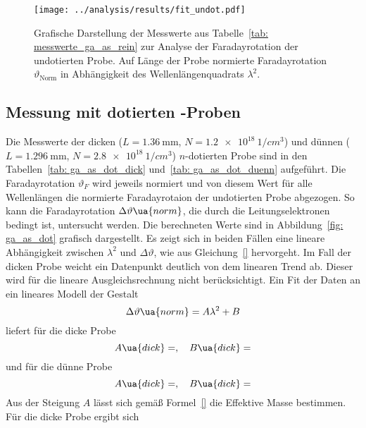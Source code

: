 \begin{figure}
\centering
\texttt{[image: ../analysis/results/fit\_undot.pdf]}
\caption{Grafische Darstellung der Messwerte aus Tabelle~\ref{tab: messwerte_ga_as_rein} zur Analyse der 
Faradayrotation der undotierten Probe. Auf Länge der Probe normierte 
Faradayrotation $\vartheta_{\text{Norm}}$ in Abhängigkeit des Wellenlängenquadrats $\lambda^2$. }
\label{fig: ga_as_rein}
\end{figure}


\subsection{Messung mit dotierten -Proben}

Die Messwerte der dicken ($L = \SI{1.36}{\milli\meter}$, $N = \SI{1.2e18}{1/cm^3}$) und dünnen 
($L = \SI{1.296}{\milli\meter}$, $N = \SI{2.8e18}{1/cm^3}$) $n$-dotierten Probe sind in den 
Tabellen~\ref{tab: ga_as_dot_dick} und~\ref{tab: ga_as_dot_duenn} aufgeführt. Die Faradayrotation $\vartheta_F$ wird jeweils normiert und von diesem 
Wert für alle Wellenlängen die normierte Faradayrotaion der undotierten Probe abgezogen. So kann 
die Faradayrotation $\Delta \vartheta\ua{norm}$, die durch die Leitungselektronen bedingt ist, untersucht werden. Die berechneten Werte 
sind in Abbildung~\ref{fig: ga_as_dot} grafisch dargestellt. Es zeigt sich in beiden Fällen eine lineare Abhängigkeit zwischen $\lambda^2$
und $\Delta \vartheta$, wie aus Gleichung~\eqref{} hervorgeht. Im Fall der dicken Probe weicht ein Datenpunkt deutlich 
von dem linearen Trend ab. Dieser wird für die lineare Ausgleichsrechnung nicht berücksichtigt. Ein Fit der Daten an 
ein lineares Modell der Gestalt 
\begin{equation}
    \Delta\vartheta\ua{norm} = A \lambda^2 + B
\end{equation}
liefert für die dicke Probe 
\begin{equation}
    A\ua{dick} = , 
    \quad B\ua{dick} = 
\end{equation}
und für die dünne Probe 
\begin{equation}
        A\ua{dick} = , 
    \quad B\ua{dick} = 
\end{equation}
Aus der Steigung $A$ lässt sich gemäß Formel~\eqref{} die Effektive Masse bestimmen. Für die dicke Probe ergibt sich 
